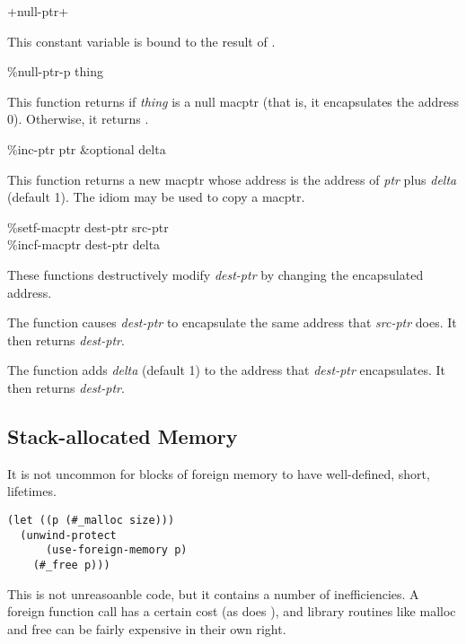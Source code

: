 \begin{defun}[Constant]
+null-ptr+

This constant variable is bound to the result of .
\end{defun}

\begin{defun}[Function]
\%null-ptr-p thing

This function returns  if {\it thing} is a null macptr (that
is, it encapsulates the address 0).  Otherwise, it returns \nil.
\end{defun}

\begin{defun}[Function]
\%inc-ptr ptr &optional delta

This function returns a new macptr whose address is the
address of {\it ptr} plus {\it delta} (default 1).  The idiom 
may be used to copy a macptr.
\end{defun}

\begin{defun}[Function]
\%setf-macptr dest-ptr src-ptr \\
\%incf-macptr dest-ptr delta

These functions destructively modify {\it dest-ptr} by changing
the encapsulated address.

The  function causes {\it dest-ptr} to encapsulate
the same address that {\it src-ptr} does.  It then returns {\it dest-ptr}.

The  function adds {\it delta} (default 1) to
the address that {\it dest-ptr} encapsulates.  It then returns
{\it dest-ptr}.
\end{defun} 

\subsection{Stack-allocated Memory}

It is not uncommon for blocks of foreign memory to have well-defined,
short, lifetimes.

\begin{lstlisting}
(let ((p (#_malloc size)))
  (unwind-protect
      (use-foreign-memory p)
    (#_free p)))
\end{lstlisting}

This is not unreasoanble code, but it contains a number of
inefficiencies.  A foreign function call has a certain cost (as does
), and library routines like malloc and free can be
fairly expensive in their own right.

